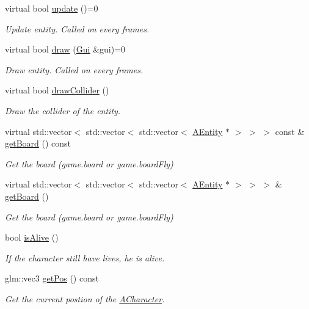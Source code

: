 \begin{DoxyCompactItemize}
virtual bool \hyperlink{class_a_character_af5a4d00f6104d45b821a2e88b80936b5}{update} ()=0
\begin{DoxyCompactList}\small\item\em Update entity. Called on every frames. \end{DoxyCompactList}\item 
virtual bool \hyperlink{class_a_character_af223d3c9dbd3143daf62e9834bd30e3d}{draw} (\hyperlink{class_gui}{Gui} \&gui)=0
\begin{DoxyCompactList}\small\item\em Draw entity. Called on every frames. \end{DoxyCompactList}\item 
virtual bool \hyperlink{class_a_character_a2cc5faf1d9047d9e51154d5663fa6c67}{draw\+Collider} ()
\begin{DoxyCompactList}\small\item\em Draw the collider of the entity. \end{DoxyCompactList}\item 
virtual std\+::vector$<$ std\+::vector$<$ std\+::vector$<$ \hyperlink{class_a_entity}{A\+Entity} $\ast$ $>$ $>$ $>$ const  \& \hyperlink{class_a_character_adecb8064d5070f15a2d6aa76a151ff33}{get\+Board} () const
\begin{DoxyCompactList}\small\item\em Get the board (game.\+board or game.\+board\+Fly) \end{DoxyCompactList}\item 
virtual std\+::vector$<$ std\+::vector$<$ std\+::vector$<$ \hyperlink{class_a_entity}{A\+Entity} $\ast$ $>$ $>$ $>$ \& \hyperlink{class_a_character_aa8f0b9b557c69eead696870c41c8321b}{get\+Board} ()
\begin{DoxyCompactList}\small\item\em Get the board (game.\+board or game.\+board\+Fly) \end{DoxyCompactList}\item 
bool \hyperlink{class_a_character_a9a1508b5026652e36ebc72972317d576}{is\+Alive} ()
\begin{DoxyCompactList}\small\item\em If the character still have lives, he is alive. \end{DoxyCompactList}\item 
glm\+::vec3 \hyperlink{class_a_character_a41875fc55beaafd65fbe53ea3abc7f98}{get\+Pos} () const
\begin{DoxyCompactList}\small\item\em Get the current postion of the \hyperlink{class_a_character}{A\+Character}. \end{DoxyCompactList}\item 

\end{DoxyCompactItemize}
